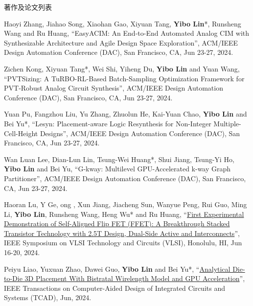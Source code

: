 \begin{rSection}{著作及论文列表}
\begin{description}[font=\normalfont, rightmargin=2em]
{}
            

\item[{[C152]}]{
        Haoyi Zhang, Jiahao Song, Xiaohan Gao, Xiyuan Tang, \textbf{Yibo Lin}*, Runsheng Wang and Ru Huang, 
    ``EasyACIM: An End-to-End Automated Analog CIM with Synthesizable Architecture and Agile Design Space Exploration'', 
    ACM/IEEE Design Automation Conference (DAC), San Francisco, CA, Jun 23-27, 2024.
    
}
            

\item[{[C151]}]{
        Zichen Kong, Xiyuan Tang*, Wei Shi, Yiheng Du, \textbf{Yibo Lin} and Yuan Wang, 
    ``PVTSizing: A TuRBO-RL-Based Batch-Sampling Optimization Framework for PVT-Robust Analog Circuit Synthesis'', 
    ACM/IEEE Design Automation Conference (DAC), San Francisco, CA, Jun 23-27, 2024.
    
}
            

\item[{[C150]}]{
        Yuan Pu, Fangzhou Liu, Yu Zhang, Zhuolun He, Kai-Yuan Chao, \textbf{Yibo Lin} and Bei Yu*, 
    ``Lesyn: Placement-aware Logic Resynthesis for Non-Integer Multiple-Cell-Height Designs'', 
    ACM/IEEE Design Automation Conference (DAC), San Francisco, CA, Jun 23-27, 2024.
    
}
            

\item[{[C149]}]{
        Wan Luan Lee, Dian-Lun Lin, Tsung-Wei Huang*, Shui Jiang, Tsung-Yi Ho, \textbf{Yibo Lin} and Bei Yu, 
    ``G-kway: Multilevel GPU-Accelerated k-way Graph Partitioner'', 
    ACM/IEEE Design Automation Conference (DAC), San Francisco, CA, Jun 23-27, 2024.
    
}
            

\item[{[C148]}]{
        Haoran Lu, Y Ge, ong , Xun Jiang, Jiacheng Sun, Wanyue Peng, Rui Guo, Ming Li, \textbf{Yibo Lin}, Runsheng Wang, Heng Wu* and Ru Huang, 
    ``\href{https://doi.org/10.1109/VLSITechnologyandCir46783.2024.10631460}{First Experimental Demonstration of Self-Aligned Flip FET (FFET): A Breakthrough Stacked Transistor Technology with 2.5T Design, Dual-Side Active and Interconnects}'', 
    IEEE Symposium on VLSI Technology and Circuits (VLSI), Honolulu, HI, Jun 16-20, 2024.
    
}
            

\item[{[J147]}]{
        Peiyu Liao, Yuxuan Zhao, Dawei Guo, \textbf{Yibo Lin} and Bei Yu*, 
    ``\href{https://doi.org/10.1109/TCAD.2023.3347293}{Analytical Die-to-Die 3D Placement With Bistratal Wirelength Model and GPU Acceleration}'', 
    IEEE Transactions on Computer-Aided Design of Integrated Circuits and Systems (TCAD), Jun, 2024.
    
}
\end{description}
\end{rSection}
